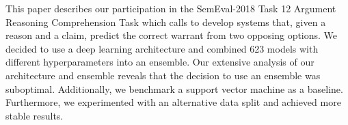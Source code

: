 This paper describes our participation in the SemEval-2018 Task 12 Argument Reasoning Comprehension Task which calls to develop systems that, given a reason and a claim, predict the correct warrant from two opposing options. We decided to use a deep learning architecture and combined 623 models with different hyperparameters into an ensemble. Our extensive analysis of our architecture and ensemble reveals that the decision to use an ensemble was suboptimal. Additionally, we benchmark a support vector machine as a baseline. Furthermore, we experimented with an alternative data split and achieved more stable results.
